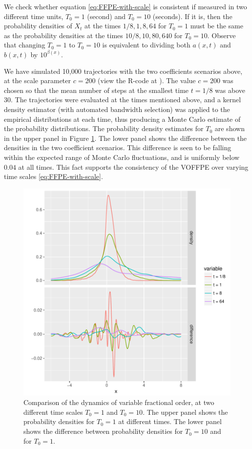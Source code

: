 \documentclass[a4paper,12pt]{elsarticle}
\numberwithin{equation}{section}
\theoremstyle{plain}
\theoremstyle{definition}
\theoremstyle{remark}
\numberwithin{equation}{section}
\newcommand{\1}{\mathbf 1}
\begin{document}
We check whether equation \eqref{eq:FFPE-with-scale} is consistent if 
measured in two 
different time units, $T_0 = 1$ (second) and $T_0 = 10$ (seconds).
If it is, then the probability densities of $X_t$ at the times 
$1/8, 1, 8, 64$ for $T_0 = 1$ must be the same as the probability 
densities at the times $10/8, 10, 80, 640$ for $T_0 = 10$.
Observe that changing $T_0 = 1$ to 
$T_0 = 10$ is equivalent to
dividing both $a(x,t)$ and $b(x,t)$ by $10^{\beta(x)}$. 

We have simulated 10,000 trajectories with the two coefficients scenarios above, 
at the scale 
parameter $c = 200$ (view the R-code at \cite{var-order-MC}).
The value $c = 200$ was chosen so that the mean number of steps at the smallest time 
$t = 1/8$ was above $30$. The trajectories were evaluated at the times mentioned
above, and a kernel density estimator (with automated bandwidth selection) was applied
to the empirical distributions at each time, thus producing a Monte Carlo 
estimate of the probability distributions.
The probability density estimates for $T_0$ are shown in the upper panel 
in Figure \ref{fig:comparison}. 
The lower panel shows the difference between the densities in the two 
coefficient scenarios. 
This difference is seen to be falling within the expected range of Monte Carlo 
fluctuations, and is uniformly below $0.04$ at all times. 
This fact supports the consistency of the VOFFPE over varying time scales 
\eqref{eq:FFPE-with-scale}. 

\begin{figure}[h]
\centering
\includegraphics{densities.pdf}
\caption{\label{fig:comparison}Comparison of the dynamics of variable fractional order, at two different time scales $T_0 = 1$ and $T_0 = 10$. The upper panel shows the probability densities for $T_0 = 1$ at different times. The lower panel shows the difference between probability densities for $T_0 = 10$ and for $T_0 = 1$.}
\end{figure}
\end{document}
